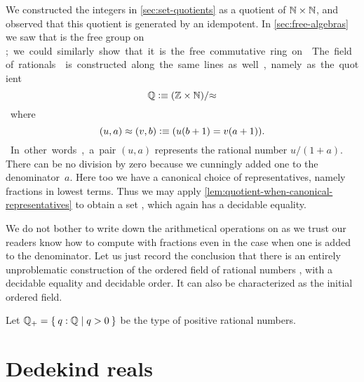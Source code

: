 We constructed the integers \Z in \autoref{sec:set-quotients} as a quotient of $\mathbb{N}\times
\mathbb{N}$, and observed that this quotient is generated by an idempotent. In
\autoref{sec:free-algebras} we saw that \Z is the free group on \unit; we could similarly
show that it is the free commutative ring on \emptyt. The field of rationals \Q is
constructed along the same lines as well, namely as the quotient
%
\[ \mathbb{Q} \vcentcolon\equiv (\mathbb{Z} \times \mathbb{N})/{\approx} \]
%
where
\[ (u,a) \approx (v,b) \vcentcolon\equiv (u (b + 1) = v (a + 1)). \]
%
In other words, a pair $(u, a)$ represents the rational number $u / (1 + a)$. There can be
no division by zero because we cunningly added one to the denominator~$a$. Here too we
have a canonical choice of representatives, namely fractions in lowest terms. Thus we may
apply \autoref{lem:quotient-when-canonical-representatives} to obtain a set \Q, which
again has a decidable equality.

We do not bother to write down the arithmetical operations on \Q as we trust our readers
know how to compute with fractions even in the case when one is added to the denominator.
Let us just record the conclusion that there is an entirely unproblematic construction of
the ordered field of rational numbers \Q, with a decidable equality and decidable order.
It can also be characterized as the initial ordered field.
%

%
Let $\Qp = \setof{ q : \Q | q > 0 }$ be the type of positive rational numbers.

\section{Dedekind reals}
\label{sec:dedekind-reals}

